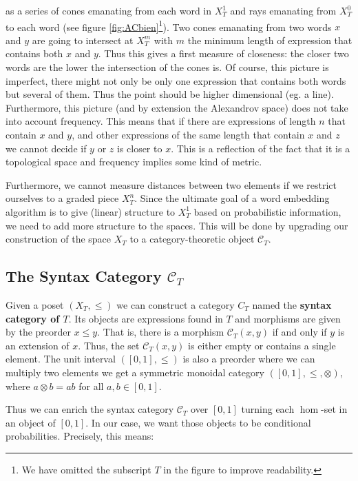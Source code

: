 \documentclass[10pt,a4paper]{elsarticle}
\newcommand{\C}{\mathcal{C}}
\begin{document}
as a series of cones emanating from each word in $X_{T}^{1}$ and rays emanating from $X_{T}^{0}$ to each word (see figure \ref{fig:ACbien}\footnote{We have omitted the subscript $T$ in the figure to improve readability.}). Two cones emanating from two words $x$ and $y$ are going to intersect at $X_{T}^{m}$ with $m$ the minimum length of expression that contains both $x$ and $y$. Thus this gives a first measure of closeness: the closer two words are the lower the intersection of the cones is. Of course, this picture is imperfect, there might not only be only one expression that contains both words but several of them. Thus the point should be higher dimensional (eg. a line). Furthermore, this picture (and by extension the Alexandrov space) does not take into account frequency. This means that if there are expressions of length $n$ that contain $x$ and $y$, and other expressions of the same length that contain $x$ and $z$ we cannot decide if $y$ or $z$ is closer to $x$. This is a reflection of the fact that it is a topological space and frequency implies some kind of metric. 

Furthermore, we cannot measure distances between two elements if we restrict ourselves to a graded piece $X_{T}^{n}$. Since the ultimate goal of a word embedding algorithm is to give (linear) structure to $X_{T}^{1}$ based on probabilistic information, we need to add more structure to the spaces. This will be done by upgrading our construction of the space $X_{T}$ to a category-theoretic object $\C_{T}$. 



\subsection{The Syntax Category $\mathcal{C}_{T}$}

Given a poset $(X_{T},\leq)$ we can construct a category $C_{T}$ named the \textbf{syntax category of $T$}. Its objects are expressions found in $T$ and morphisms are given by the preorder $x\leq y$. That is, there is a morphism $\C_{T}(x,y)$ if and only if $y$ is an extension of $x$. Thus, the set $\C_{T}(x,y)$ is either empty or contains a single element. The unit interval $([0,1],\leq)$ is also a preorder where we can multiply two elements we get a symmetric monoidal category $([0,1],\leq,\otimes)$, where $a\otimes b = ab$ for all $a, b\in [0,1]$.

Thus we can enrich the syntax category $\C_{T}$ over $[0,1]$ turning each $\hom$-set in an object of $[0,1]$. In our case, we want those objects to be conditional probabilities. Precisely, this means:
\end{document}
